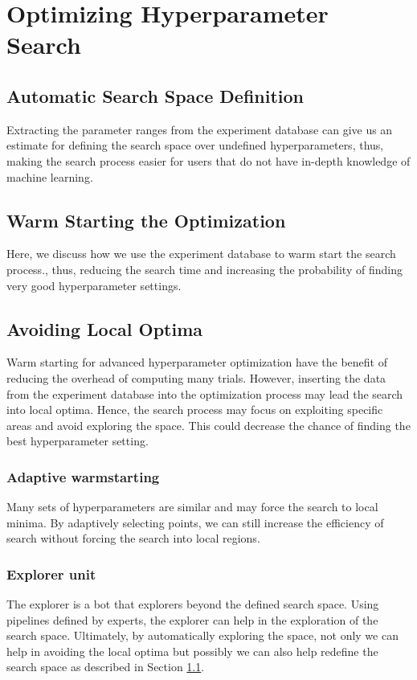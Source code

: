 \section{Optimizing Hyperparameter Search} \label{sec-hyperparam-optimization}
\subsection{Automatic Search Space Definition}\label{sub-section-automatic-search-definition}
Extracting the parameter ranges from the experiment database can give us an estimate for defining the search space over undefined hyperparameters, thus, making the search process easier for users that do not have in-depth knowledge of machine learning.

\subsection{Warm Starting the Optimization}
Here, we discuss how we use the experiment database to warm start the search process., thus, reducing the search time and increasing the probability of finding very good hyperparameter settings.

\subsection{Avoiding Local Optima}
Warm starting for advanced hyperparameter optimization have the benefit of reducing the overhead of computing many trials.
However, inserting the data from the experiment database into the optimization process may lead the search into local optima.
Hence, the search process may focus on exploiting specific areas and avoid exploring the space.
This could decrease the chance of finding the best hyperparameter setting.


\subsubsection{Adaptive warmstarting}
Many sets of hyperparameters are similar and may force the search to local minima.
By adaptively selecting points, we can still increase the efficiency of search without forcing the search into local regions.

\subsubsection{Explorer unit}
The explorer is a bot that explorers beyond the defined search space.
Using pipelines defined by experts, the explorer can help in the exploration of the search space.
Ultimately, by automatically exploring the space, not only we can help in avoiding the local optima but possibly we can also help redefine the search space as described in Section \ref{sub-section-automatic-search-definition}.


